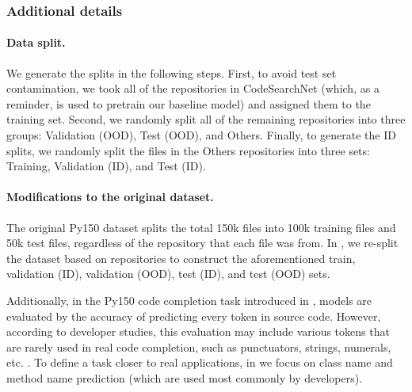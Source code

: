 \subsubsection{Additional details}

\paragraph{Data split.}
We generate the splits in the following steps. First, to avoid test set contamination, we took all of the repositories in CodeSearchNet (which, as a reminder, is used to pretrain our baseline model) and assigned them to the training set. Second, we randomly split all of the remaining repositories into three groups: Validation (OOD), Test (OOD), and Others. Finally, to generate the ID splits, we randomly split the files in the Others repositories into three sets: Training, Validation (ID), and Test (ID).


\paragraph{Modifications to the original dataset.}
The original Py150 dataset \citep{raychev2016probabilistic} splits the total 150k files into 100k training files and 50k test files,
regardless of the repository that each file was from.
In \Py, we re-split the dataset based on repositories to construct the aforementioned train, validation (ID), validation (OOD), test (ID), and test (OOD) sets.

Additionally, in the Py150 code completion task introduced in \citet{CodeXGLUE}, models are evaluated by the accuracy of predicting every token in source code. However, according to developer studies, this evaluation may include various tokens that are rarely used in real code completion, such as punctuators, strings, numerals, etc. \citep{robbes2008program,proksch2016evaluating, hellendoorn2019code}.
To define a task closer to real applications, in \Py we focus on class name and method name prediction (which are used most commonly by developers).
